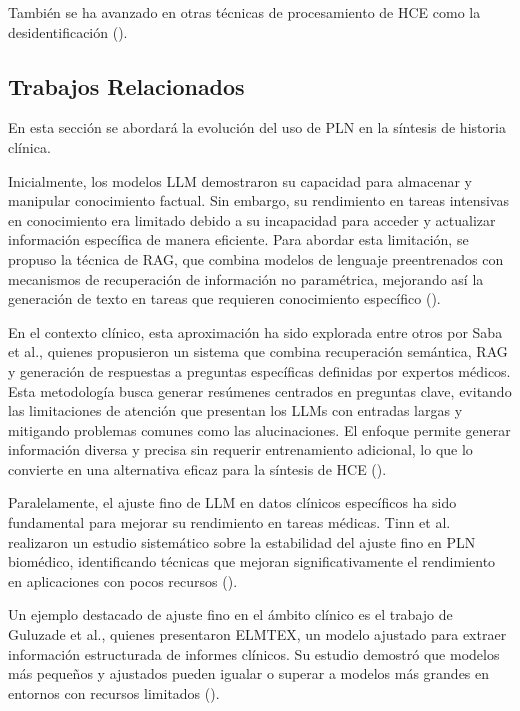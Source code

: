 \documentclass[../main.tex]{subfiles}
\begin{document}
También se ha avanzado en otras técnicas de procesamiento de HCE como la desidentificación (\cite{MORENOBAREA2025109576}).

\subsection{Trabajos Relacionados}

En esta sección se abordará la evolución del uso de PLN en la síntesis de historia clínica.

Inicialmente, los modelos LLM demostraron su capacidad para almacenar y manipular conocimiento factual. Sin embargo, su rendimiento en tareas intensivas en conocimiento era limitado debido a su incapacidad para acceder y actualizar información específica de manera eficiente. Para abordar esta limitación, se propuso la técnica de RAG, que combina modelos de lenguaje preentrenados con mecanismos de recuperación de información no paramétrica, mejorando así la generación de texto en tareas que requieren conocimiento específico (\cite{lewis2021retrievalaugmentedgenerationknowledgeintensivenlp}).

En el contexto clínico, esta aproximación ha sido explorada entre otros por Saba et al., quienes propusieron un sistema que combina recuperación semántica, RAG y generación de respuestas a preguntas específicas definidas por expertos médicos. Esta metodología busca generar resúmenes centrados en preguntas clave, evitando las limitaciones de atención que presentan los LLMs con entradas largas y mitigando problemas comunes como las alucinaciones. El enfoque permite generar información diversa y precisa sin requerir entrenamiento adicional, lo que lo convierte en una alternativa eficaz para la síntesis de HCE (\cite{saba2024questionansweringbasedsummarizationelectronic}).

Paralelamente, el ajuste fino de LLM en datos clínicos específicos ha sido fundamental para mejorar su rendimiento en tareas médicas. Tinn et al. realizaron un estudio sistemático sobre la estabilidad del ajuste fino en PLN biomédico, identificando técnicas que mejoran significativamente el rendimiento en aplicaciones con pocos recursos (\cite{TINN2023100729}).

Un ejemplo destacado de ajuste fino en el ámbito clínico es el trabajo de Guluzade et al., quienes presentaron ELMTEX, un modelo ajustado para extraer información estructurada de informes clínicos. Su estudio demostró que modelos más pequeños y ajustados pueden igualar o superar a modelos más grandes en entornos con recursos limitados (\cite{guluzade2025elmtexfinetuninglargelanguage}).
\end{document}
